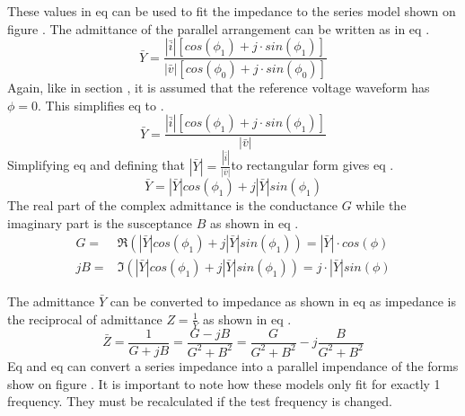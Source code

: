 These values in eq  can be used to fit the impedance to the series model shown on figure . The admittance of the parallel arrangement can be written as in eq .
\begin{equation}\label{eq:4_1_5_ParallelModel1}
    \bar Y = \frac{|\bar i| [cos(\phi_1) + j\cdot sin(\phi_1)]}{|\bar v| [cos(\phi_0) +j\cdot sin(\phi_0)]}
\end{equation}
Again, like in section , it is assumed that the reference voltage waveform has $\phi = 0$. This simplifies eq  to .
\begin{equation}\label{eq:4_1_5_ParallelModel2}
    \bar Y = \frac{|\bar i| [cos(\phi_1) + j\cdot sin(\phi_1)]}{|\bar v|}
\end{equation}
Simplifying eq  and defining that $|\bar Y| = \frac{|\bar i|}{|\bar v|}$to rectangular form gives eq .
\begin{equation}\label{eq:4_1_5_ParallelModel3}
    \bar Y = |\bar Y| cos(\phi_1) + j |\bar Y| sin(\phi_1)
\end{equation}
The real part of the complex admittance is the conductance $G$ while the imaginary part is the susceptance $B$ as shown in eq .
\begin{equation}\label{eq:4_1_5_ParallelModel4}
    \begin{split}
        G =& \Re(|\bar Y| cos(\phi_1) + j |\bar Y| sin(\phi_1)) = |\bar Y| \cdot cos(\phi)\\
        jB =& \Im(|\bar Y| cos(\phi_1) + j |\bar Y| sin(\phi_1)) =  j\cdot |\bar Y| sin(\phi)  
    \end{split}
\end{equation}

The admittance $\bar Y$ can be converted to impedance as shown in eq  as impedance is the reciprocal of admittance $Z = \frac{1}{Y}$ as shown in eq .
\begin{equation}\label{eq:4_1_5_ParallelModel5}
    \bar Z = \frac{1}{G + jB} =\frac{G-jB}{G^2 + B^2} = \frac{G}{G^2 + B^2} -j\frac{B}{G^2 + B^2}
\end{equation}
Eq  and eq  can convert a series impedance into a parallel impendance of the forms show on figure . It is important to note how these models only fit for exactly 1 frequency. They must be recalculated if the test frequency is changed.
